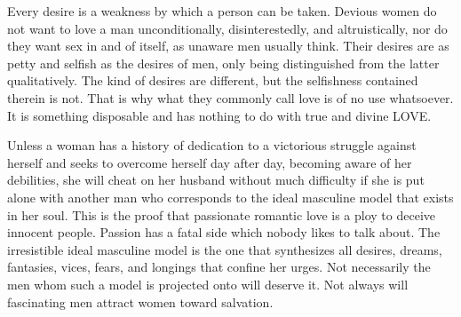 \par Every desire is a weakness by which a person can be taken. Devious women do not want to love a man unconditionally, disinterestedly, and altruistically, nor do they want sex in and of itself, as unaware men usually think. Their desires are as petty and selfish as the desires of men, only being distinguished from the latter qualitatively. The kind of desires are different, but the selfishness contained therein is not. That is why what they commonly call love is of no use whatsoever. It is something disposable and has nothing to do with true and divine LOVE.

\par Unless a woman has a history of dedication to a victorious struggle against herself and seeks to overcome herself day after day, becoming aware of her debilities, she will cheat on her husband without much difficulty if she is put alone with another man who corresponds to the ideal masculine model that exists in her soul. This is the proof that passionate romantic love is a ploy to deceive innocent people. Passion has a fatal side which nobody likes to talk about. The irresistible ideal masculine model is the one that synthesizes all desires, dreams, fantasies, vices, fears, and longings that confine her urges. Not necessarily the men whom such a model is projected onto will deserve it. Not always will fascinating men attract women toward salvation.

